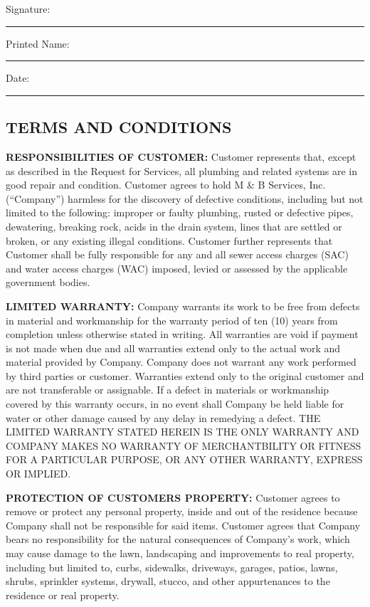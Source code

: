 \documentclass{article}
\begin{document}
\noindent Signature: \rule{4cm}{0.4pt}\hspace{0.5cm} Printed Name: \rule{4cm}{0.4pt}\hspace{0.5cm} Date: \rule{2cm}{0.4pt}

\newpage


\begin{footnotesize}
\begin{center}
\section*{TERMS AND CONDITIONS}    
\end{center}

\noindent \textbf{RESPONSIBILITIES OF CUSTOMER:} Customer represents that, except as described in the Request for Services, all plumbing and related systems are in good repair and condition. Customer agrees to hold M \& B Services, Inc. (“Company”) harmless for the discovery of defective conditions, including but not limited to the following: improper or faulty plumbing, rusted or defective pipes, dewatering, breaking rock, acids in the drain system, lines that are settled or broken, or any existing illegal conditions. Customer further represents that Customer shall be fully responsible for any and all sewer access charges (SAC) and water access charges (WAC) imposed, levied or assessed by the applicable government bodies.\vspace{8pt}

\noindent \textbf{LIMITED WARRANTY:} Company warrants its work to be free from defects in material and workmanship for the warranty period of ten (10) years from completion unless otherwise stated in writing. All warranties are void if payment is not made when due and all warranties extend only to the actual work and material provided by Company. Company does not warrant any work performed by third parties or customer. Warranties extend only to the original customer and are not transferable or assignable. If a defect in materials or workmanship covered by this warranty occurs, in no event shall Company be held liable for water or other damage caused by any delay in remedying a defect. THE LIMITED WARRANTY STATED HEREIN IS THE ONLY WARRANTY AND COMPANY MAKES NO WARRANTY OF MERCHANTBILITY OR FITNESS FOR A PARTICULAR PURPOSE, OR ANY OTHER WARRANTY, EXPRESS OR IMPLIED.\vspace{12pt}

\noindent \textbf{PROTECTION OF CUSTOMERS PROPERTY:} Customer agrees to remove or protect any personal property, inside and out of the residence because Company shall not be responsible for said items. Customer agrees that Company bears no responsibility for the natural consequences of Company’s work, which may cause damage to the lawn, landscaping and improvements to real property, including but limited to, curbs, sidewalks, driveways, garages, patios, lawns, shrubs, sprinkler systems, drywall, stucco, and other appurtenances to the residence or real property.\vspace{8pt}


\end{footnotesize}
\end{document}
